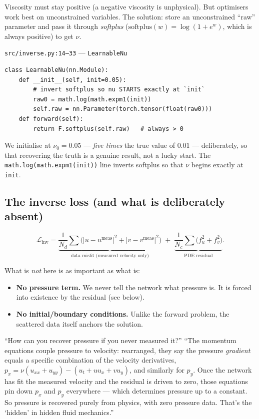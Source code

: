 \documentclass[11pt,a4paper]{article}
\begin{document}
Viscosity must stay positive (a negative viscosity is unphysical). But
optimisers work best on unconstrained variables. The solution: store an
unconstrained ``raw'' parameter and pass it through \emph{softplus}
($\text{softplus}(w) = \log(1+e^w)$, which is always positive) to get $\nu$.

\begin{coderef}{\texttt{src/inverse.py:14--33} --- \texttt{LearnableNu}}
\begin{lstlisting}[style=pycode]
class LearnableNu(nn.Module):
    def __init__(self, init=0.05):
        # invert softplus so nu STARTS exactly at `init`
        raw0 = math.log(math.expm1(init))
        self.raw = nn.Parameter(torch.tensor(float(raw0)))
    def forward(self):
        return F.softplus(self.raw)   # always > 0
\end{lstlisting}
We initialise at $\nu_0 = 0.05$ --- \emph{five times} the true value of $0.01$ ---
deliberately, so that recovering the truth is a genuine result, not a lucky
start. The \texttt{math.log(math.expm1(init))} line inverts softplus so that
$\nu$ begins exactly at \texttt{init}.
\end{coderef}

\subsection{The inverse loss (and what is deliberately absent)}
\label{sec:inverse-loss}

\begin{equation}
\mathcal{L}_{\text{inv}} =
\underbrace{\frac{1}{N_d}\sum \big(|u-u^{\text{meas}}|^2 + |v-v^{\text{meas}}|^2\big)}_{\text{data misfit (measured velocity only)}}
\;+\;
\underbrace{\frac{1}{N_c}\sum\big(f_u^2 + f_v^2\big)}_{\text{PDE residual}}.
\label{eq:inverse-loss}
\end{equation}

What is \emph{not} here is as important as what is:
\begin{itemize}[leftmargin=2em]
  \item \textbf{No pressure term.} We never tell the network what pressure is. It
        is forced into existence by the residual (see below).
  \item \textbf{No initial/boundary conditions.} Unlike the forward problem, the
        scattered data itself anchors the solution.
\end{itemize}

\begin{defensebox}{``How can you recover pressure if you never measured it?''}
``The momentum equations couple pressure to velocity: rearranged, they say the
pressure \emph{gradient} equals a specific combination of the velocity
derivatives, $p_x = \nu(u_{xx}+u_{yy}) - (u_t + uu_x + vu_y)$, and similarly for
$p_y$. Once the network has fit the measured velocity and the residual is driven
to zero, those equations pin down $p_x$ and $p_y$ everywhere --- which
determines pressure up to a constant. So pressure is recovered purely from
physics, with zero pressure data. That's the `hidden' in hidden fluid
mechanics.''
\end{defensebox}
\end{document}
